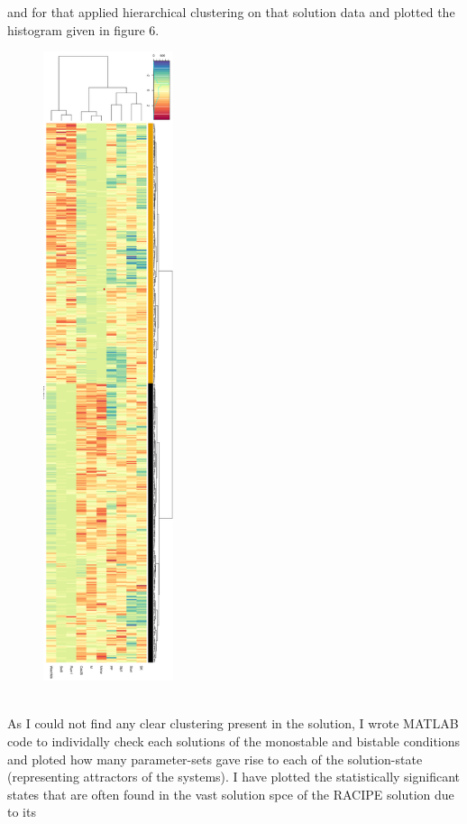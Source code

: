 \documentclass{article}
\begin{document}
and for that applied hierarchical clustering on that solution data and plotted 
the histogram given in figure 6.
\begin{figure}[H]
  \centering
  \includegraphics[width=38mm, scale=0.5]{hierarchical_clustering.png} \\
   \\
\end{figure}
\newpage
As I could not find any clear clustering present in the solution, I wrote MATLAB 
code to individally check each solutions of the monostable and bistable conditions
and ploted how many parameter-sets gave rise to each of the solution-state (representing 
attractors of the systems). I have plotted the statistically significant states 
that are often found in the vast solution spce of the RACIPE solution due to its 
\end{document}

